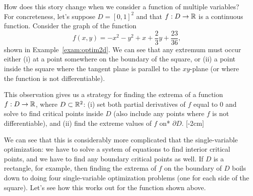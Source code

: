 \documentclass[svgnames]{report}
\begin{document}
How does this story change when we consider a function of multiple
variables? For concreteness, let's suppose $D = [0,1]^2$ and that
$f:D \to \mathbb{R}$ is a continuous function. Consider the graph of the
function
  \[
    f(x,y) = -x^2 - y^2 + x + \frac{2}{3} y + \frac{23}{36}, 
  \]
  shown in Example~\ref{exam:optim2d}. We can see that any extremum must
  occur either (i) at a point somewhere on the boundary of the square,
  or (ii) a point inside the square where the tangent plane is
  parallel to the $xy$-plane (or where the function is not
  differentiable).

  This observation gives us a strategy for finding the extrema of
  a function $f:D \to \mathbb{R}$, where $D \subset \mathbb{R}^2$: (i) set both
  partial derivatives of $f$ equal to 0 and solve to find critical
  points inside $D$ (also include any points where $f$ is not
  differentiable), and (ii) find the extreme values of $f$ on*
  $\partial D$. [-2cm]
  
  We can see that this is considerably more complicated that the
  single-variable optimization: we have to solve a system of equations
  to find interior critical points, and we have to find any boundary critical
  points as well. If $D$ is a rectangle, for example, then finding
  the extrema of $f$ on the boundary of $D$ boils down to doing four
  single-variable optimization problems (one for each side of the
  square). Let's see how this works out for the function shown above.
\end{document}

